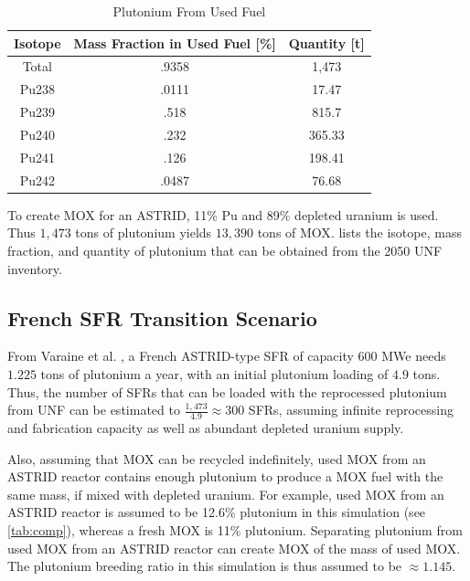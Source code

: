 		
		\begin{table}[h]
			\centering
			\begin{tabular}{|c|c|c|}
				\hline
				Isotope & Mass Fraction in Used Fuel [\%] & Quantity [t] \\ \hline
				Total & .9358 & 1,473 \\ \hline
				Pu238 & .0111 & 17.47 \\ \hline
				Pu239 & .518 & 815.7 \\ \hline
				Pu240 & .232 & 365.33 \\ \hline
				Pu241 & .126 & 198.41 \\ \hline
				Pu242 & .0487 & 76.68 \\ \hline
			\end{tabular}
			\caption{Plutonium From Used Fuel}
			\label{tab:pu}
		\end{table}
		
		
		To create \gls{MOX} for an ASTRID, 11\% Pu and 89\% depleted uranium is used.
		Thus $1,473$ tons of plutonium yields $13,390$ tons of
		\gls{MOX}.  lists the isotope, mass fraction,
		and quantity of plutonium that can be obtained from the 2050 \gls{UNF} inventory.
		
		
		\subsection{French \gls{SFR} Transition Scenario}
		
		From Varaine et al. \cite{marsaultmarie-sophie_pre-conceptual_2012}, a French
		ASTRID-type \gls{SFR} of capacity 600 MWe needs $1.225$ tons of
		plutonium a year, with an initial plutonium loading of $4.9$ tons. 
		Thus, the number of \glspl{SFR} that can be loaded with the reprocessed
		plutonium from \gls{UNF} can be estimated to $\frac{1,473}{4.9} \approx 300$ \glspl{SFR},
		assuming infinite reprocessing and fabrication capacity as well as
		abundant depleted uranium supply. 
		
		Also, assuming that \gls{MOX} can be recycled indefinitely,
		used \gls{MOX} from an ASTRID reactor
		contains enough plutonium to produce a \gls{MOX} fuel with
		the same mass, if mixed with depleted uranium. For example,
		used \gls{MOX} from an ASTRID reactor is assumed to be 12.6\% plutonium
		in this simulation (see \cref{tab:comp}), whereas a fresh \gls{MOX} is 11\% plutonium.
		Separating plutonium from used \gls{MOX} from
		an ASTRID reactor can create \gls{MOX} of the mass of used \gls{MOX}.
		The plutonium breeding ratio in this simulation is thus assumed to be
		$\approx 1.145$.
		
